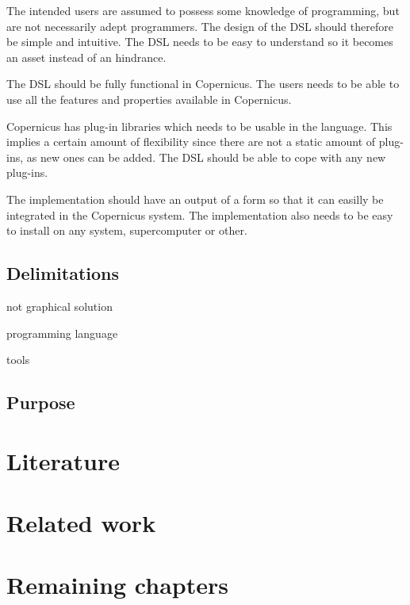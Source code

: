 The intended users are assumed to possess some knowledge of
programming, but are not necessarily adept programmers. The design of
the DSL should therefore be simple and intuitive. The DSL needs to be
easy to understand so it becomes an asset instead of an hindrance.

The DSL should be fully functional in Copernicus. The users needs to
be able to use all the features and properties available in
Copernicus.

Copernicus has plug-in libraries which needs to be usable in the
language. This implies a certain amount of flexibility since there are
not a static amount of plug-ins, as new ones can be added. The DSL
should be able to cope with any new plug-ins.

The implementation should have an output of a form so that it can
easilly be integrated in the Copernicus system. The implementation
also needs to be easy to install on any system, supercomputer or
other.

\subsection{Delimitations}
not graphical solution

programming language

tools

\subsection{Purpose}

\section{Literature}


\section{Related work}

\section{Remaining chapters}


